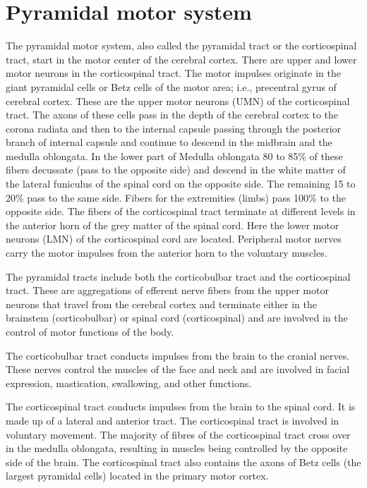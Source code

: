 \documentclass[]{book}
\begin{document}
\hypertarget{pyramidal-motor-system}{%
\section{Pyramidal motor system}\label{pyramidal-motor-system}}

The pyramidal motor system, also called the pyramidal tract or the corticospinal tract, start in the motor center of the cerebral cortex. There are upper and lower motor neurons in the corticospinal tract. The motor impulses originate in the giant pyramidal cells or Betz cells of the motor area; i.e., precentral gyrus of cerebral cortex. These are the upper motor neurons (UMN) of the corticospinal tract. The axons of these cells pass in the depth of the cerebral cortex to the corona radiata and then to the internal capsule passing through the posterior branch of internal capsule and continue to descend in the midbrain and the medulla oblongata. In the lower part of Medulla oblongata 80 to 85\% of these fibers decussate (pass to the opposite side) and descend in the white matter of the lateral funiculus of the spinal cord on the opposite side. The remaining 15 to 20\% pass to the same side. Fibers for the extremities (limbs) pass 100\% to the opposite side. The fibers of the corticospinal tract terminate at different levels in the anterior horn of the grey matter of the spinal cord. Here the lower motor neurons (LMN) of the corticospinal cord are located. Peripheral motor nerves carry the motor impulses from the anterior horn to the voluntary muscles.

The pyramidal tracts include both the corticobulbar tract and the corticospinal tract. These are aggregations of efferent nerve fibers from the upper motor neurons that travel from the cerebral cortex and terminate either in the brainstem (corticobulbar) or spinal cord (corticospinal) and are involved in the control of motor functions of the body.

The corticobulbar tract conducts impulses from the brain to the cranial nerves. These nerves control the muscles of the face and neck and are involved in facial expression, mastication, swallowing, and other functions.

The corticospinal tract conducts impulses from the brain to the spinal cord. It is made up of a lateral and anterior tract. The corticospinal tract is involved in voluntary movement. The majority of fibres of the corticospinal tract cross over in the medulla oblongata, resulting in muscles being controlled by the opposite side of the brain. The corticospinal tract also contains the axons of Betz cells (the largest pyramidal cells) located in the primary motor cortex.
\end{document}
